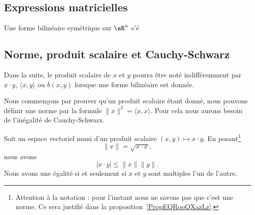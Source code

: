 \subsection{Expressions matricielles}

Une forme bilinéaire symétrique sur \( \eR^n\) s'é

\subsection{Norme, produit scalaire et Cauchy-Schwarz}

Dans la suite, le produit scalaire de \( x\) et \( y\) pourra être noté indifféremment par \( x\cdot y\), \( \langle x, y\rangle \) ou \( b(x,y)\) lorsque une forme bilinéaire est donnée.

Nous commençons par prouver qu'un produit scalaire étant donné, nous pouvons définir une norme par la formule \( \| x \|^2=\langle x, x\rangle \). Pour cela nous aurons besoin de l'inégalité de Cauchy-Schwarz.

\begin{theorem}      \label{ThoAYfEHG}
    Soit un espace vectoriel muni d'un produit scalaire \( (x,y)\mapsto x\cdot y\). En posant\footnote{Attention à la notation : pour l'instant nous ne savons pas que c'est une norme. Ce sera justifié dans la proposition~\ref{PropEQRooQXazLz}.}
    \begin{equation}
        \| x \|=\sqrt{ x\cdot x },
    \end{equation}
    nous avons
    \begin{equation}        \label{EQooZDSHooWPcryG}
		| x\cdot y |\leq \| x \|\| y \|.
	\end{equation}
    Nous avons une égalité si et seulement si \( x\) et \( y\) sont multiples l'un de l'autre.
\end{theorem}

